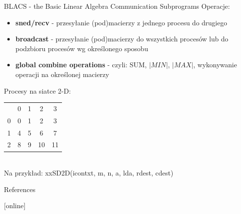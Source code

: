 	\begin{frame}{BLACS - the Basic Linear Algebra Communication Subprograms}
		Operacje: 
		\begin{itemize}
			\item	\textbf{sned/recv} - przesyłanie (pod)macierzy z jednego procesu do drugiego
			\item \textbf{broadcast} - przesyłanie (pod)macierzy do wszystkich procesów lub do podzbioru procesów wg określonego sposobu
			\item \textbf{global combine operations} - czyli: SUM, $|MIN|$, $|MAX|$, wykonywanie operacji na określonej macierzy
		\end{itemize}
		Procesy na siatce 2-D:
		\begin{tabular}{ c|c|c|c|c| }
			\multicolumn{1}{c}{} & \multicolumn{1}{c}{0} & \multicolumn{1}{c}{1} & \multicolumn{1}{c}{2} & \multicolumn{1}{c}{3} \\
			\cline{2-5} 0 & 0 & 1 & 2 & 3 \\
			\cline{2-5} 1 & 4 & 5 & 6 & 7 \\
			\cline{2-5} 2 & 8 & 9 & 10 & 11 \\
			\cline{2-5}
		\end{tabular} \\
		Na przykład: xxSD2D(icontxt, m, n, a, lda, rdest, cdest)
	\end{frame}
	\begin{frame}{References}
	\begin{thebibliography}{9}
		\end{thebibliography}
	\end{frame}
	
